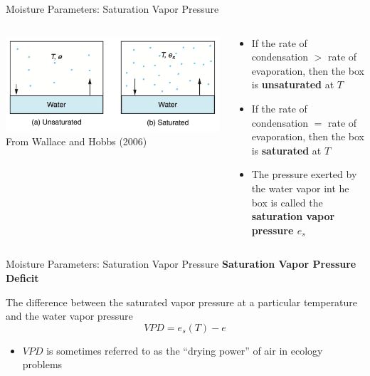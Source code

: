 \begin{frame}{Moisture Parameters: Saturation Vapor Pressure}
\begin{columns}[T]
    \begin{column}{.5\textwidth}
    \begin{minipage}[c][0.8\textheight][c]{\linewidth}
    \includegraphics[width=1\textwidth]{fig1}\\
    \centering \small From Wallace and Hobbs (2006)
    \end{minipage}
    \end{column}
    \begin{column}{.5\textwidth}
    \begin{minipage}[c][0.8\textheight][c]{\linewidth}
   \begin{itemize}
   	\item If the rate of condensation $>$ rate of evaporation, then the box is \textbf{unsaturated} at $T$
   	\item If the rate of condensation $=$ rate of evaporation, then the box is \textbf{saturated} at $T$
   	\item The pressure exerted by the water vapor int he box is called the \textbf{saturation vapor pressure $e_s$}
   \end{itemize}
      \end{minipage}
    \end{column}
  \end{columns}
\end{frame}


\begin{frame}{Moisture Parameters: Saturation Vapor Pressure}
\textbf{Saturation Vapor Pressure Deficit}
\begin{fancydefs}
	The difference between the saturated vapor pressure at a particular temperature and the water vapor pressure
	$$VPD = e_s(T) - e$$
\end{fancydefs}
\begin{itemize}
	\item $VPD$ is sometimes referred to as the ``drying power'' of air in ecology problems
\end{itemize}
\end{frame}

